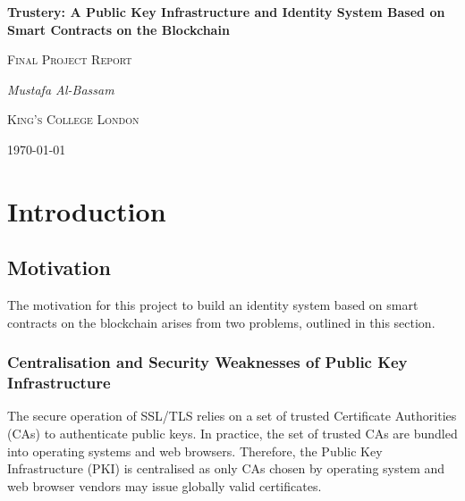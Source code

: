 \documentclass[12pt]{report}
\newenvironment{originality}
	{\renewcommand{\abstractname}{Originality Avowal}
		\begin{abstract}}
	{\end{abstract}
		\clearpage}
\newenvironment{acknowledgements}
	{\renewcommand{\abstractname}{Acknowledgements}
		\begin{abstract}}
	{\end{abstract}
		\clearpage}
\begin{document}
	\begin{titlepage}
		\centering
		{\huge\bfseries Trustery: A Public Key Infrastructure and Identity System Based on Smart Contracts on the Blockchain\par}
		\vspace{1cm}
		{\Large\scshape Final Project Report\par}
		\vspace{1.5cm}
		{\Large\itshape Mustafa Al-Bassam\par}
		\vfill
		{\LARGE\scshape King's College London\par}
		\vfill
		{\large \today\par}
	\end{titlepage}
	
	\begin{abstract}
		test
	\end{abstract}
	
	\begin{acknowledgements}
		test
	\end{acknowledgements}
	
	\begin{originality}
		I verify that I am the sole author of this report, except for the content of this originality avowal and where explicitly stated to the contrary.
		
		I grant King's College London the right to make paper and electronic copies of the submitted work for purposes of marking, plagiarism detection and archival, and to upload a copy of the work to a trusted plagiarism detection service. I confirm this report does not exceed 25,000 words.
		
		\bigskip
		\noindent Mustafa Al-Bassam\newline
		\today
	\end{originality}
	
	\tableofcontents
	
	\chapter{Introduction}
	\section{Motivation}
	The motivation for this project to build an identity system based on smart contracts on the blockchain arises from two problems, outlined in this section.
	
	\subsection{Centralisation and Security Weaknesses of Public Key Infrastructure}
	The secure operation of SSL/TLS relies on a set of trusted Certificate Authorities (CAs) to authenticate public keys\cite{1}. In practice, the set of trusted CAs are bundled into operating systems and web browsers.\cite{27} Therefore, the Public Key Infrastructure (PKI) is centralised as only CAs chosen by operating system and web browser vendors may issue globally valid certificates.
\end{document}
